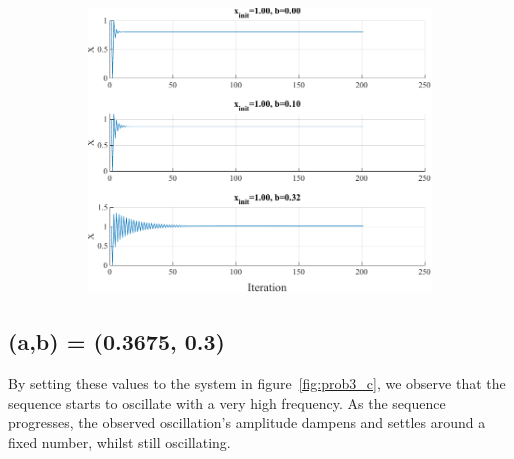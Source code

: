 \begin{figure}[htpb]
\begin{subfigure}{0.47\textwidth}
		\includegraphics[width=\textwidth]{../Problem 3/prob3_(b)_x_init_1.00.pdf}
		\caption{}
	\end{subfigure}
	\caption{}
	\label{fig:prob3_multiple_x_multiple_b}
\end{figure}

\subsection{(a,b) = (0.3675, 0.3)}

By setting these values to the system in figure~\ref{fig:prob3_c}, we observe that the sequence starts to oscillate with a very high frequency. As the sequence progresses, the observed oscillation's amplitude dampens and settles around a fixed number, whilst still oscillating.

